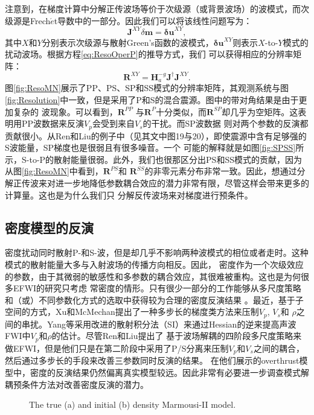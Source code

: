 注意到，在梯度计算中分解正传波场等价于次级源（或背景波场）的波模式，而次级源是Frech{$\acute{e}$}t导数中的一部分。因此我们可以将该线性问题写为：
\begin{equation}
    \mathbf{J}^{XY}\delta\mathbf{m}=\mathbf{\delta u}^{XY},
    \label{eq:JXY}
\end{equation}
其中$X$和$Y$分别表示次级源与散射Green's函数的波模式，$\mathbf{\delta u}^{XY}$则表示${X}$-to-${Y}$模式的扰动波场。根据方程\eqref{eq:ResoOperP}的推导方式，我们
可以获得相应的分辨率矩阵：
\begin{equation}
    \mathbf{R}^{XY}=\mathbf{H}_a^{-g}\mathbf{J}^{\dagger}\mathbf{J}^{XY}. 
    \label{eq:RXY}  
\end{equation}
图\ref{fig:ResoMN}展示了PP、PS、SP和SS模式的分辨率矩阵，其观测系统与图\ref{fig:Resolution}中一致，但是采用了P和S的混合震源。图中的带对角结果是由于更加复杂的
波现象。可以看到，$\mathbf{R}^{PP}$ 与$\mathbf{R}^P$十分类似，而$\mathbf{R}^{SP}$却几乎为空矩阵。这表明用PP波数据来反演$V_p$会受到来自$V_s$的干扰。而SP波数据
则对两个参数的反演都贡献很小。从Ren和Liu\cite{ren.liu:2016}的例子中（见其文中图19与20），即使震源中含有足够强的S波能量，SP梯度也是很弱且有很多噪音。一个
可能的解释就是如图\ref{fig:SPSS}所示，S-to-P的散射能量很弱。此外，我们也很那区分出PS和SS模式的贡献，因为从图\ref{fig:ResoMN}中看到，$\mathbf{R}^{PS}$和
$\mathbf{R}^{SS}$的非零元素分布非常一致。因此，想通过分解正传波来对进一步地降低参数耦合效应的潜力非常有限，尽管这样会带来更多的计算量。这也是为什么我们只
分解反传波场来对梯度进行预条件。
\subsection{密度模型的反演}
密度扰动同时散射P-和S-波，但是却几乎不影响两种波模式的相位或者走时。这种模式的散射能量大多与入射波场的传播方向相反\cite[]{wu.aki:1985,tarantola:1986}。因此，
密度作为一个次级效应的参数，由于其微弱的敏感性和多参数的耦合效应\cite[]{tarantola:1986,forgues.lambare:1997}，其很难被重构。这也是为何很多EFWI的研究只考虑
常密度的情形\cite[]{shipp:2002,sears:2008,brossier2009}。只有很少一部分的工作能够从多尺度策略和（或）不同参数化方式的选取中获得较为合理的密度反演结果
\cite{jeong2012full}。最近，基于子空间的方式\cite[]{kennett:1988}，Xu和McMechan\cite{xu.mcmechan:2014}提出了一种多步长的梯度类方法来压制$V_p$, $V_s$和
$\rho$之间的串扰。Yang等\cite{yang:2016}采用改进的散射积分法（SI）来通过Hessian的逆来提高声波FWI中$V_p$和$\rho$的估计。尽管Ren和Liu\cite{ren.liu:2016}提出了
基于波场解耦的四阶段多尺度策略来做EFWI，但是他们只是在第二阶段中采用了P/S分离来压制$V_p$和$V_s$之间的耦合，然后通过多步长的手段来改善三参数同时反演的结果。
在他们展示的overthrust模型中，密度的反演结果仍然偏离真实模型较远。因此非常有必要进一步调查模式解耦预条件方法对改善密度反演的潜力。
\begin{figure*}
    \begin{center}
    \caption{
                The true (a) and initial (b) density Marmousi-II model.
    }
    \label{fig:Marrho}
    \end{center}
\end{figure*}

